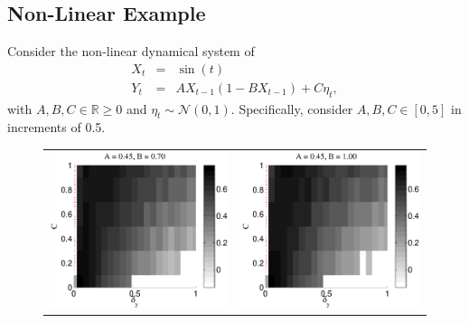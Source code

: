 \documentclass[a4paper,11pt,twocolumn]{article}
\begin{document}
\subsection{Non-Linear Example}
Consider the non-linear dynamical system of
\begin{eqnarray}
\label{eqn:nonlinearEX}
X_t &=& \sin(t)\\
Y_t &=& AX_{t-1}\left(1-BX_{t-1}\right)+C\eta_t,
\end{eqnarray}
with $A,B,C\in\mathbb{R}\ge 0$ and $\eta_t\sim\mathcal{N}\left(0,1\right)$.  Specifically, consider $A,B,C\in[0,5]$ in increments of 0.5.
\begin{figure}[ht]
\begin{tabular}{cc}
\includegraphics[scale=0.30]{NonlinearCyclicexample_Bdy_A45B70.eps} &
\includegraphics[scale=0.30]{NonlinearCyclicexample_Bdy_A45B100.eps} \\

\end{tabular}
\end{figure}
\end{document}
